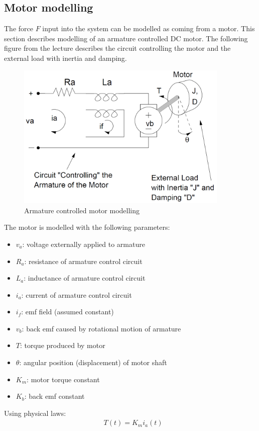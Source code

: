 \documentclass [12pt,letterpaper]{exam}
\begin{document}
\subsection{Motor modelling}
The force $F$ input into the system can be modelled as coming from a motor. This section describes modelling of an armature controlled DC motor. The following figure from the lecture describes the circuit controlling the motor and the external load with inertia and damping.
\begin{figure}[H]
  \centering
    \includegraphics[width=10.15cm, height=7cm]{motor_diagram} 
  \caption{Armature controlled motor modelling}
  \label{fig:motor_diagram}
\end{figure}

The motor is modelled with the following parameters:
\begin{itemize}
    \item $v_a$: voltage externally applied to armature
    \item $R_a$: resistance of armature control circuit
    \item $L_a$: inductance of armature control circuit
    \item $i_a$: current of armature control circuit
    \item $i_f$: emf field (assumed constant)
    \item $v_b$: back emf caused by rotational motion of armature
    \item $T$: torque produced by motor
    \item $\theta$: angular position (displacement) of motor shaft
    \item $K_m$: motor torque constant
    \item $K_b$: back emf constant
\end{itemize}

Using physical laws:
\begin{align}
& T(t) = K_mi_a(t)
\end{align}
\end{document}
